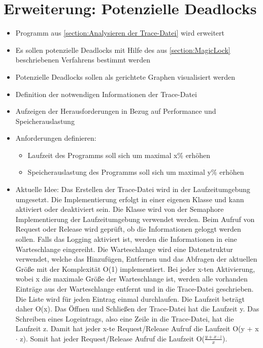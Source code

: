 \section{Erweiterung: Potenzielle Deadlocks}
\label{section:Erweiterung: Potenzielle Deadlocks}
\begin{itemize}
  \item Programm aus \cref{section:Analysieren der Trace-Datei} wird erweitert
  \item Es sollen potenzielle Deadlocks mit Hilfe des aus \cref{section:MagicLock}
 beschriebenen Verfahrens bestimmt werden
  \item Potenzielle Deadlocks sollen als gerichtete Graphen visualisiert werden
\end{itemize}


\begin{itemize}
  \item Definition der notwendigen Informationen der Trace-Datei
  \item Aufzeigen der Herausforderungen in Bezug auf Performance und
  Speicherauslastung
\item Anforderungen definieren:
\begin{itemize}
  \item Laufzeit des Programms soll sich um maximal x\% erhöhen
  \item Speicherauslastung des Programms soll sich um maximal y\% erhöhen
\end{itemize}
  \item Aktuelle Idee: Das Erstellen der Trace-Datei wird in der
  Laufzeitumgebung umgesetzt. Die Implementierung erfolgt in einer eigenen
  Klasse und kann aktiviert oder deaktiviert sein. Die Klasse wird von der
  Semaphore Implementierung der Laufzeitumgebung verwendet werden. Beim Aufruf
  von Request oder Release wird geprüft, ob die Informationen geloggt werden
  sollen. Falls das Logging aktiviert ist, werden die Informationen in eine
  Warteschlange eingereiht. Die Warteschlange wird eine Datenstruktur
  verwendet, welche das Hinzufügen, Entfernen und das Abfragen der aktuellen
  Größe mit der Komplexität O(1) implementiert. Bei jeder x-ten Aktivierung,
  wobei x die maximale Größe der Warteschlange ist, werden alle vorhanden
  Einträge aus der Warteschlange entfernt und in die Trace-Datei geschrieben.
  Die Liste wird für jeden Eintrag einmal durchlaufen. Die Laufzeit beträgt
  daher O(x). Das Öffnen und Schließen der Trace-Datei hat die Laufzeit y. Das
  Schreiben eines Logeintrags, also eine Zeile in die Trace-Datei, hat die
  Laufzeit z. Damit hat jeder x-te Request/Release Aufruf die Laufzeit O(y + x
  $\cdot$ z). Somit hat jeder Request/Release Aufruf die Laufzeit O($\frac{y +
  x \cdot z}{x}$).


\end{itemize}
